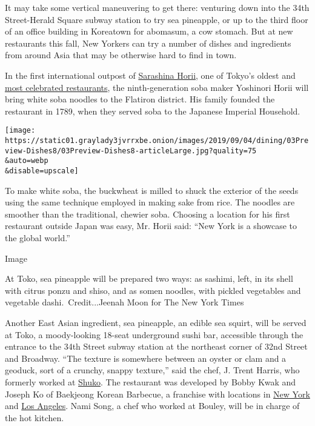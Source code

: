 It may take some vertical maneuvering to get there: venturing down into
the 34th Street-Herald Square subway station to try sea pineapple, or up
to the third floor of an office building in Koreatown for abomasum, a
cow stomach. But at new restaurants this fall, New Yorkers can try a
number of dishes and ingredients from around Asia that may be otherwise
hard to find in town.

In the first international outpost of
\href{https://www.sarashina-horii.com/en/}{Sarashina Horii}, one of
Tokyo's oldest and
\href{https://watch.travelchannel.com/tv-shows/anthony-bourdain-no-reservations/full-episodes/tokyo}{most
celebrated restaurants}, the ninth-generation soba maker Yoshinori Horii
will bring white soba noodles to the Flatiron district. His family
founded the restaurant in 1789, when they served soba to the Japanese
Imperial Household.

\texttt{[image: https://static01.graylady3jvrrxbe.onion/images/2019/09/04/dining/03Preview-Dishes8/03Preview-Dishes8-articleLarge.jpg?quality=75\\\&auto=webp\\\&disable=upscale]}

To make white soba, the buckwheat is milled to shuck the exterior of the
seeds using the same technique employed in making sake from rice. The
noodles are smoother than the traditional, chewier soba. Choosing a
location for his first restaurant outside Japan was easy, Mr. Horii
said: ``New York is a showcase to the global world.''

Image

At Toko, sea pineapple will be prepared two ways: as sashimi, left, in
its shell with citrus ponzu and shiso, and as somen noodles, with
pickled vegetables and vegetable dashi.~Credit...Jeenah Moon for The New
York Times

Another East Asian ingredient, sea pineapple, an edible sea squirt, will
be served at Toko, a moody-looking 18-seat underground sushi bar,
accessible through the entrance to the 34th Street subway station at the
northeast corner of 32nd Street and Broadway. ``The texture is somewhere
between an oyster or clam and a geoduck, sort of a crunchy, snappy
texture,'' said the chef, J. Trent Harris, who formerly worked at
\href{https://www.shukonyc.com/}{Shuko}. The restaurant was developed by
Bobby Kwak and Joseph Ko of Baekjeong Korean Barbecue, a franchise with
locations in \href{https://www.baekjeongnyc.com/}{New York} and
\href{http://kijung.com/baekjeong-korean-bbq/}{Los Angeles}. Nami Song,
a chef who worked at Bouley, will be in charge of the hot kitchen.

